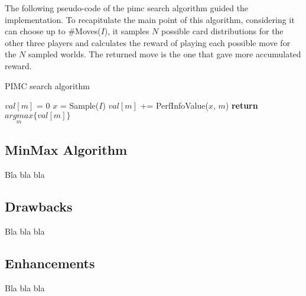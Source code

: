 The following pseudo-code of the \ac{pimc} search algorithm guided the implementation.
To recapitulate the main point of this algorithm, considering it can choose up to \#Moves($I$), it samples $N$ possible card distributions for the other three players and calculates the reward of playing each possible move for the $N$ sampled worlds. The returned move is the one that gave more accumulated reward.

\begin{algorithm}
	\caption{PIMC search algorithm}
	\begin{algorithmic}[1]
				\State $val[m]$ = 0
			\EndFor
				\State $x$ = Sample($I$)
					\State $val[m]$ += PerfInfoValue($x$, $m$)
				\EndFor
			\EndFor
			\State \textbf{return} $\underset{m}{argmax}\{ val[m] \}$
		\EndProcedure
	\end{algorithmic}
\end{algorithm}


\subsection*{MinMax Algorithm}

Bla bla bla


\subsection{Drawbacks}

Bla bla bla


\subsection{Enhancements}

Bla bla bla
